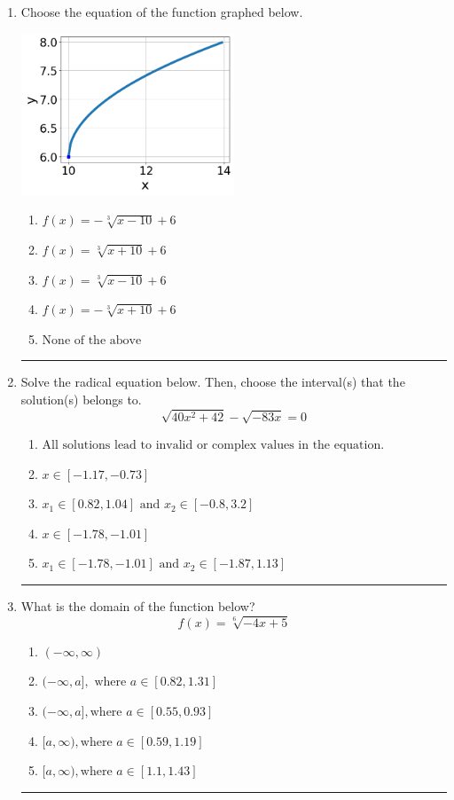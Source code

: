 \documentclass[14pt]{extbook}
\newcommand{\litem}[1]{\item#1\hspace*{-1cm}\rule{\textwidth}{0.4pt}}
\begin{document}
\begin{enumerate}
{\begin{enumerate}[label=\Alph*.]
\end{enumerate} }
\litem{
Choose the equation of the function graphed below.
\begin{center}
    \includegraphics[width=0.5\textwidth]{../Figures/radicalGraphToEquationCopyC.png}
\end{center}
\begin{enumerate}[label=\Alph*.]
\item \( f(x) = - \sqrt[3]{x - 10} + 6 \)
\item \( f(x) = \sqrt[3]{x + 10} + 6 \)
\item \( f(x) = \sqrt[3]{x - 10} + 6 \)
\item \( f(x) = - \sqrt[3]{x + 10} + 6 \)
\item \( \text{None of the above} \)

\end{enumerate} }
\litem{
Solve the radical equation below. Then, choose the interval(s) that the solution(s) belongs to.\[ \sqrt{40 x^2 + 42} - \sqrt{-83 x} = 0 \]\begin{enumerate}[label=\Alph*.]
\item \( \text{All solutions lead to invalid or complex values in the equation.} \)
\item \( x \in [-1.17,-0.73] \)
\item \( x_1 \in [0.82, 1.04] \text{ and } x_2 \in [-0.8,3.2] \)
\item \( x \in [-1.78,-1.01] \)
\item \( x_1 \in [-1.78, -1.01] \text{ and } x_2 \in [-1.87,1.13] \)

\end{enumerate} }
\litem{
What is the domain of the function below?\[ f(x) = \sqrt[6]{-4 x + 5} \]\begin{enumerate}[label=\Alph*.]
\item \( (-\infty, \infty) \)
\item \( (-\infty, a], \text{ where } a \in [0.82, 1.31] \)
\item \( (-\infty, a], \text{where } a \in [0.55, 0.93] \)
\item \( [a, \infty), \text{where } a \in [0.59, 1.19] \)
\item \( [a, \infty), \text{where } a \in [1.1, 1.43] \)

\end{enumerate} }
\end{enumerate}
\end{document}
